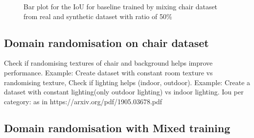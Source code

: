 \begin{figure}
    \centering
    \resizebox{\textwidth}{!}{}
    \caption{Bar plot for the IoU for baseline trained by mixing chair dataset from real and synthetic dataset with ratio of 50\%}
    \label{fig:ablation2}
\end{figure}

\subsection{Domain randomisation on chair dataset}
Check if randomising textures of chair and background helps improve performance.  Example: Create dataset with constant room texture vs randomising texture,
Check if lighting helps (indoor, outdoor). Example: Create a dataset with constant lighting(only outdoor lighting) vs indoor lighting.
Iou per category: as in https://arxiv.org/pdf/1905.03678.pdf

\subsection{Domain randomisation with Mixed training}


